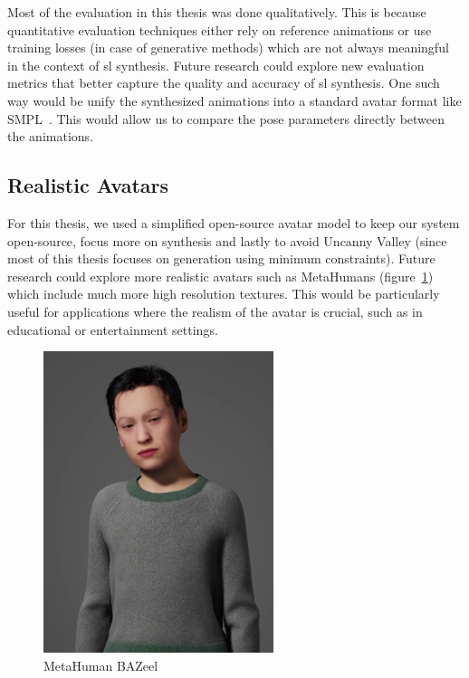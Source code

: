 \documentclass[../../main.tex]{subfiles}
\begin{document}
Most of the evaluation in this thesis was done qualitatively. This is because quantitative evaluation techniques either rely on reference animations or use training losses (in case of generative methods) which are not always meaningful in the context of \gls{sl} synthesis. Future research could explore new evaluation metrics that better capture the quality and accuracy of \gls{sl} synthesis. One such way would be unify the synthesized animations into a standard avatar format like SMPL~\cite{10.1145/3596711.3596800}. This would allow us to compare the pose parameters directly between the animations.

\subsection{Realistic Avatars}
\label{ch:conclusion:future:realistic_avatars}

For this thesis, we used a simplified open-source avatar model to keep our system open-source, focus more on synthesis and lastly to avoid Uncanny Valley (since most of this thesis focuses on generation using minimum constraints). Future research could explore more realistic avatars such as MetaHumans (figure~\ref{fig:conclusion:metahuman_bazeel}) which include much more high resolution textures. This would be particularly useful for applications where the realism of the avatar is crucial, such as in educational or entertainment settings. 

\begin{figure}[h]
    \centering
    \includegraphics[width=0.6\textwidth]{chapters/conclusion/images/metahuman_bazeel.png}
    \caption{MetaHuman BAZeel}
    \label{fig:conclusion:metahuman_bazeel}
\end{figure}
\end{document}
